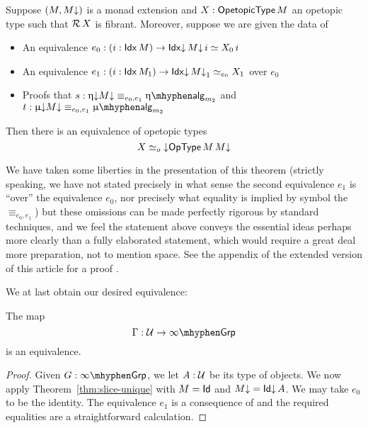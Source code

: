 \begin{thm}
  \label{thm:slice-unique}
  Suppose $(M , M{\downarrow})$ is a monad extension and $X : \mathsf{OpetopicType}\, M$
  an opetopic type such that $\mathcal{R}\, X$ is fibrant.  Moreover,
  suppose we are given the data of
  \begin{itemize}
  \item An equivalence $e_0 : (i : \mathsf{Idx}\, M) \to \mathsf{Idx}{\downarrow}\, M{\downarrow}\, i \simeq X_0\, i$
  \item An equivalence $e_1 : (i : \mathsf{Idx}\, M_1) \to \mathsf{Idx}{\downarrow}\, M{\downarrow}_1 \simeq_{e_0} X_1$ over $e_0$
  \item Proofs that $s : \upetad M\da \equiv_{e_0 , e_1} \upeta\alg_{m_2}$ and $t : \upmud M\da \equiv_{e_0 , e_1} \upmu\alg_{m_2}$    
  \end{itemize}
  Then there is an equivalence of opetopic types
  \[ X \simeq_{o} {\downarrow}\mathsf{OpType}\, M\, M{\downarrow} \]
\end{thm}

We have taken some liberties in the presentation of this theorem
(strictly speaking, we have not stated precisely in what sense the
second equivalence $e_1$ is ``over'' the equivalence $e_0$, nor
precisely what equality is implied by symbol the $\equiv_{e_0,e_1}$)
but these omissions can be made perfectly rigorous by standard
techniques, and we feel the statement above conveys the essential
ideas perhaps more clearly than a fully elaborated statement, which
would require a great deal more preparation, not to mention space.
See the appendix of the extended version of this article for a proof
\cite[{Theorem \ref{thm:slice-unique}}]{allioux2021types}.

We at last obtain our desired equivalence:

\begin{thm}
  \label{thm:types-are-oogrps}
  The map
  \[ \Gamma : \UU \to \ooGrp \]
  is an equivalence.
\end{thm}

\begin{proof}
  Given $G : \ooGrp$, we let $A : \mathcal{U}$ be its type of objects.  We now
  apply Theorem~\ref{thm:slice-unique} with $M = \mathsf{Id}$ and
  $M{\downarrow} = \mathsf{Id{\downarrow}}\, A$.  We may take $e_0$ to be the identity.  The
  equivalence $e_1$ is a consequence of \cite[Theorem 5.8.2]{hottbook}
  and the required equalities are a straightforward calculation.
\end{proof}

